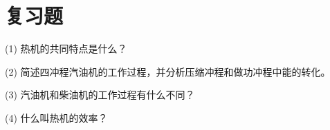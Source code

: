 \section*{复习题}

(1) 热机的共同特点是什么？

(2) 简述四冲程汽油机的工作过程，并分析压缩冲程和做功冲程中能的转化。

(3) 汽油机和柴油机的工作过程有什么不同？

(4) 什么叫热机的效率？

